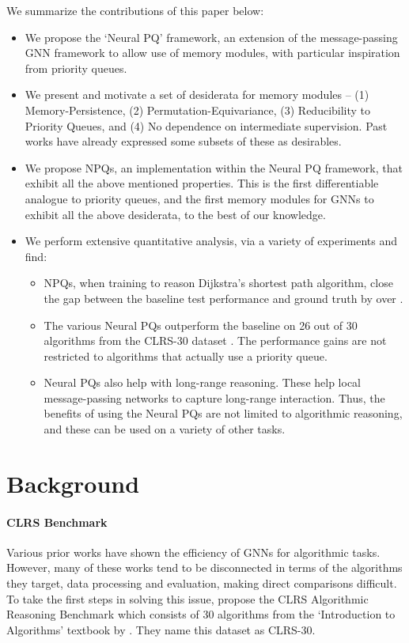 \documentclass{article}
\theoremstyle{plain}
\theoremstyle{definition}
\theoremstyle{remark}
\begin{document}
We summarize the contributions of this paper below:
\begin{itemize}
    \item
        We propose the `Neural PQ' framework, an extension of the message-passing GNN framework to allow use of memory modules, with particular inspiration from priority queues.
    \item
        We present and motivate a set of desiderata for memory modules -- (1) Memory-Persistence, (2) Permutation-Equivariance, (3) Reducibility to Priority Queues,
        and (4) No dependence on intermediate supervision. Past works have already expressed some subsets of these as desirables.
    \item
        We propose NPQs, an implementation within the Neural PQ framework, that exhibit all the above mentioned properties.
        This is the first differentiable analogue to priority queues, and the first memory modules for GNNs to exhibit all the above desiderata, to the best of our knowledge.
    \item
        We perform extensive quantitative analysis, via a variety of experiments and find:
        \begin{itemize}
            \item NPQs, when training to reason Dijkstra's shortest path algorithm, close the gap between the baseline test performance and
                  ground truth by over .
            \item
                The various Neural PQs outperform the baseline on 26 out of 30 algorithms from the CLRS-30 dataset \citep{Velickovic-CLRS}.
                The performance gains are not restricted to algorithms that actually use a priority queue.
\item
                Neural PQs also help with long-range reasoning. These help local message-passing networks to capture long-range interaction.
                Thus, the benefits of using the Neural PQs are not limited to algorithmic reasoning, and these can be used on a variety of other tasks.
        \end{itemize}
\end{itemize}

\section{Background}
\label{sec:clrs-background}
\paragraph{CLRS Benchmark \citep{Velickovic-CLRS}} Various prior works have shown the efficiency of GNNs for algorithmic tasks.
However, many of these works tend to be disconnected in terms of the algorithms they target, data processing and evaluation, making direct comparisons difficult.
To take the first steps in solving this issue, \citet{Velickovic-CLRS} propose the CLRS Algorithmic Reasoning Benchmark which consists of
30 algorithms from the `Introduction to Algorithms' textbook by \citet{Cormen-CLRS}. They name this dataset as CLRS-30.
\end{document}
